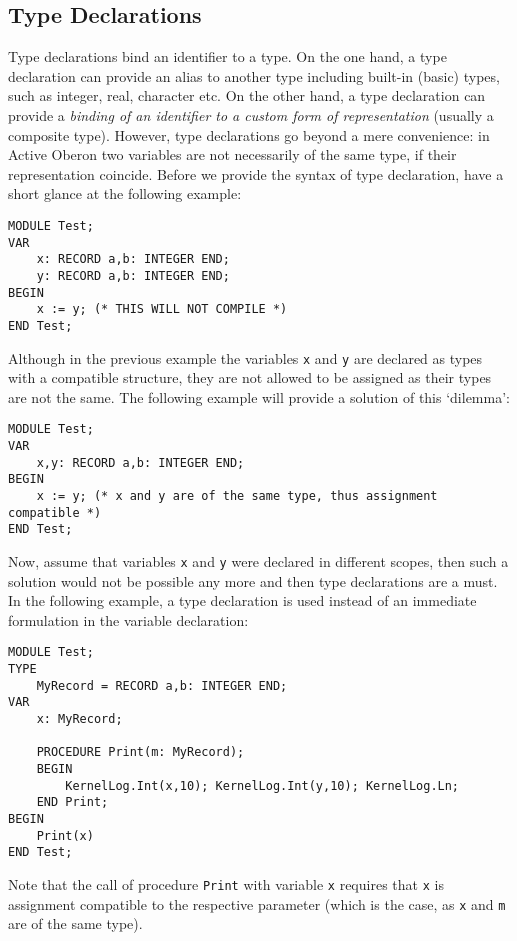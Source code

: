 \documentclass[a4paper,11pt]{article}
\begin{document}
\subsection{Type Declarations}
Type declarations bind an identifier to a type. On the one hand, a type declaration can provide an alias to another type including built-in (basic) types, such as integer, real, character etc. On the other hand, a type declaration can provide a {\em binding of an identifier to a custom form of representation} (usually a composite type). However, type declarations go beyond a mere convenience: in Active Oberon two variables are not necessarily of the same type, if their representation coincide. Before we provide the syntax of type declaration, have a short glance at the following example:
\begin{lstlisting}[language=Oberon,frame=none,caption={Incompatible types}]
MODULE Test; 
VAR 
    x: RECORD a,b: INTEGER END; 
    y: RECORD a,b: INTEGER END; 
BEGIN 
    x := y; (* THIS WILL NOT COMPILE *) 
END Test; 
\end{lstlisting}
Although in the previous example the variables \verb+x+ and \verb+y+ are declared as types with a compatible structure, they are not allowed to be assigned as their types are not the same. The following example will provide a solution of this `dilemma': 
\begin{lstlisting}[language=Oberon,frame=none,caption={Same Types}]
MODULE Test;
VAR
    x,y: RECORD a,b: INTEGER END;
BEGIN
    x := y; (* x and y are of the same type, thus assignment compatible *)
END Test;
\end{lstlisting}
Now, assume that variables \verb+x+ and \verb+y+ were declared in different scopes, then such a solution would not be possible any more and then type declarations are a must. In the following example, a type declaration is used instead of an immediate formulation in the variable declaration:
\begin{lstlisting}[language=Oberon,frame=none,caption={Using type declarations}]
MODULE Test;
TYPE
    MyRecord = RECORD a,b: INTEGER END; 
VAR
    x: MyRecord; 
    
    PROCEDURE Print(m: MyRecord); 
    BEGIN
        KernelLog.Int(x,10); KernelLog.Int(y,10); KernelLog.Ln; 
    END Print; 
BEGIN
    Print(x)
END Test;
\end{lstlisting}
Note that the call of procedure \verb+Print+ with variable \verb+x+ requires that \verb+x+ is assignment compatible to the respective parameter (which is the case, as \verb+x+ and \verb+m+ are of the same type). 
\end{document}
